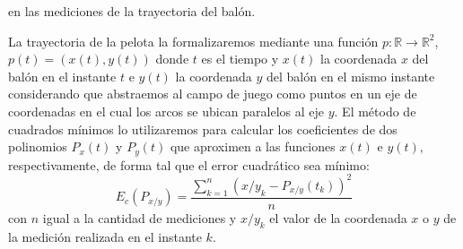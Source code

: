 en las mediciones de la trayectoria del balón.
\par
La trayectoria de la pelota la formalizaremos mediante una función $p:\mathbb{R} \to \mathbb{R}^2$, $p(t) = (x(t),y(t))$ donde 
$t$ es el tiempo y $x(t)$ la coordenada $x$ del balón en el instante $t$ e $y(t)$ la coordenada $y$ del balón en el mismo instante considerando
que abstraemos al campo de juego como puntos en un eje de coordenadas en el cual los arcos se ubican paralelos al eje $y$.
El método de cuadrados mínimos\cite[\emph{8.1}]{burden}  lo utilizaremos para calcular los coeficientes de dos polinomios $P_x(t)$ y $P_y(t)$ que aproximen a las funciones 
$x(t)$ e $y(t)$, respectivamente, de forma tal que el error cuadrático sea mínimo:
\begin{displaymath}
  E_c(P_{x/y}) = \frac{\sum_{k=1}^{n}({x/y}_k-P_{x/y}(t_k))^2}{n} 
\end{displaymath}
con $n$ igual a la cantidad de mediciones y $x/y_k$ el valor de la coordenada $x$ o $y$ de la medición realizada en el instante $k$.

